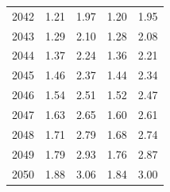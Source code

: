 \begin{table}
\begin{tabular}{lrrrr}
2042 & 1.21 & 1.97 & 1.20 & 1.95 \\
2043 & 1.29 & 2.10 & 1.28 & 2.08 \\
2044 & 1.37 & 2.24 & 1.36 & 2.21 \\
2045 & 1.46 & 2.37 & 1.44 & 2.34 \\
2046 & 1.54 & 2.51 & 1.52 & 2.47 \\
2047 & 1.63 & 2.65 & 1.60 & 2.61 \\
2048 & 1.71 & 2.79 & 1.68 & 2.74 \\
2049 & 1.79 & 2.93 & 1.76 & 2.87 \\
2050 & 1.88 & 3.06 & 1.84 & 3.00 \\
\bottomrule
\end{tabular}
\end{table}
